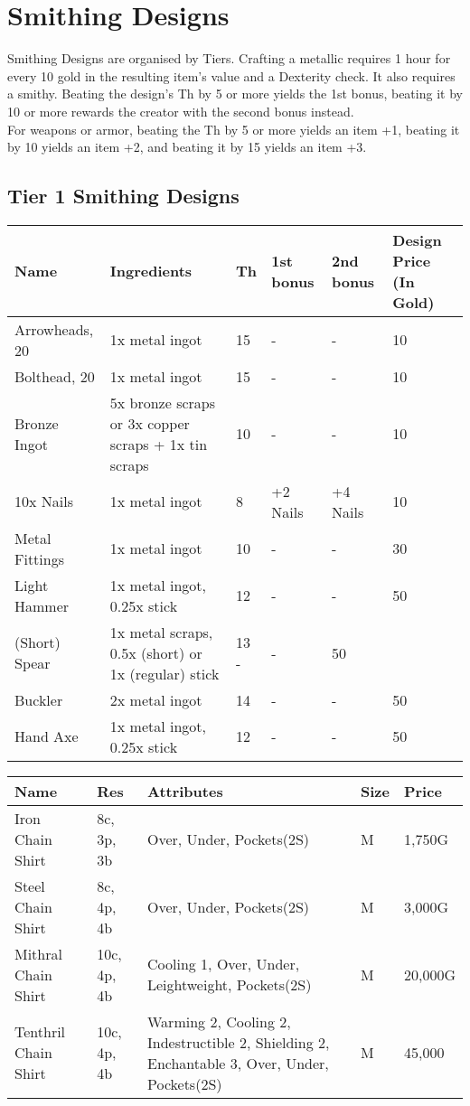 \section{Smithing Designs}\label{sec:smithingDesigns}
Smithing Designs are organised by Tiers.
Crafting a metallic requires 1 hour for every 10 gold in the resulting item's value and a Dexterity check.
It also requires a smithy.
Beating the design's Th by 5 or more yields the 1st bonus, beating it by 10 or more rewards the creator with the second bonus instead.\\
For weapons or armor, beating the Th by 5 or more yields an item +1, beating it by 10 yields an item +2, and beating it by 15 yields an item +3.\\

\subsection{Tier 1 Smithing Designs}
\begin{longtable}{p{1.5cm} | p{2.5cm} | l | p{2cm} | p{2cm} | p{1cm} }
	Name & Ingredients & Th & 1st bonus & 2nd bonus & Design Price (In Gold)\\ \hline
	Arrowheads, 20 & 1x metal ingot & 15 & - & - & 10\\
	Bolthead, 20 & 1x metal ingot & 15 & - & - & 10\\
	Bronze Ingot & 5x bronze scraps or 3x copper scraps + 1x tin scraps & 10 & - & - & 10\\
	10x Nails & 1x metal ingot & 8 & +2 Nails & +4 Nails & 10\\
	Metal Fittings & 1x metal ingot & 10 & - & - & 30\\
	Light Hammer & 1x metal ingot, 0.25x stick & 12 & - & - & 50\\
	(Short) Spear & 1x metal scraps, 0.5x (short) or 1x (regular) stick & 13 - & - & 50\\
	Buckler & 2x metal ingot & 14 & - & - & 50\\
	Hand Axe & 1x metal ingot, 0.25x stick & 12 & - & - & 50\\
\end{longtable}

\begin{longtable}{p{3.5cm} | p{1.5cm} | p{5cm} | p{1cm} | p{1.25cm}}
	Name & Res &  Attributes & Size & Price\\ \hline
	Iron Chain Shirt & 8c, 3p, 3b & Over, Under, Pockets(2S) & M & 1,750G\\

	Steel Chain Shirt & 8c, 4p, 4b & Over, Under, Pockets(2S) & M & 3,000G\\

	Mithral Chain Shirt & 10c, 4p, 4b & Cooling 1, Over, Under, Leightweight, Pockets(2S) & M & 20,000G\\

	Tenthril Chain Shirt & 10c, 4p, 4b & Warming 2, Cooling 2, Indestructible 2, Shielding 2, Enchantable 3, Over, Under, Pockets(2S) & M & 45,000\\
\end{longtable}

